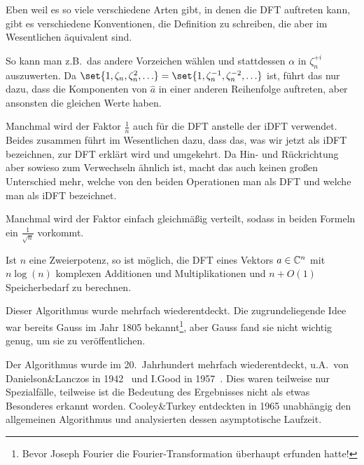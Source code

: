 \begin{remark}
    Eben weil es so viele verschiedene Arten gibt, in denen die DFT auftreten kann, gibt es verschiedene Konventionen, die Definition zu schreiben, die aber im Wesentlichen äquivalent sind.

    So kann man z.B.\ das andere Vorzeichen wählen und stattdessen $\alpha$ in $\zeta_n^{+i}$ auszuwerten. Da $\set{1, \zeta_n, \zeta_n^2, \ldots} = \set{1, \zeta_n^{-1}, \zeta_n^{-2}, \ldots}$ ist, führt das nur dazu, dass die Komponenten von $\hat{a}$ in einer anderen Reihenfolge auftreten, aber ansonsten die gleichen Werte haben.

    Manchmal wird der Faktor $\frac{1}{n}$ auch für die DFT anstelle der iDFT verwendet. Beides zusammen führt im Wesentlichen dazu, dass das, was wir jetzt als iDFT bezeichnen, zur DFT erklärt wird und umgekehrt. Da Hin- und Rückrichtung aber sowieso zum Verwechseln ähnlich ist, macht das auch keinen großen Unterschied mehr, welche von den beiden Operationen man als DFT und welche man als iDFT bezeichnet.

    Manchmal wird der Faktor einfach gleichmäßig verteilt, sodass in beiden Formeln ein $\frac{1}{\sqrt{n}}$ vorkommt.
\end{remark}

\begin{theorem}
    Ist $n$ eine Zweierpotenz, so ist möglich, die DFT eines Vektors $a\in\mathbb{C}^n$ mit $n\log(n)$ komplexen Additionen und Multiplikationen und $n+O(1)$ Speicherbedarf zu berechnen.
\end{theorem}

\begin{remark}
    Dieser Algorithmus wurde mehrfach wiederentdeckt. Die zugrundeliegende Idee war bereits Gauss im Jahr 1805 bekannt\footnote{Bevor Joseph Fourier die Fourier-Transformation überhaupt erfunden hatte!}, aber Gauss fand sie nicht wichtig genug, um sie zu veröffentlichen.

    Der Algorithmus wurde im 20.\ Jahrhundert mehrfach wiederentdeckt, u.A.\ von Danielson\&Lanczos in 1942~\cite{danielson_lanczos} und I.Good in 1957~\cite{good}. Dies waren teilweise nur Spezialfälle, teilweise ist die Bedeutung des Ergebnisses nicht als etwas Besonderes erkannt worden. Cooley\&Turkey entdeckten in 1965 unabhängig den allgemeinen Algorithmus und analysierten dessen asymptotische Laufzeit.
\end{remark}

